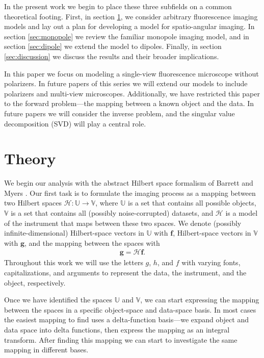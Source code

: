 \documentclass[]{osa-article}
\providecommand{\mb}[1]{\mathbf{#1}}
\providecommand{\mc}[1]{\mathcal{#1}}
\providecommand{\mbb}[1]{\mathbb{#1}}
\begin{document}
In the present work we begin to place these three subfields on a common
theoretical footing. First, in section \ref{sec:theory}, we consider arbitrary
fluorescence imaging models and lay out a plan for developing a model for
spatio-angular
imaging. %
In section \ref{sec:monopole} we review the familiar monopole imaging model, and
in section \ref{sec:dipole} we extend the model to
dipoles. %
Finally, in section \ref{sec:discussion} we discuss the results and their
broader implications.

In this paper we focus on modeling a single-view fluorescence microscope without
polarizers. In future papers of this series we will extend our models to include
polarizers and multi-view microscopes. Additionally, we have restricted this
paper to the forward problem---the mapping between a known object and the data. In
future papers we will consider the inverse problem, and the singular value
decomposition (SVD) will play a central role.
 
\section{Theory}\label{sec:theory}
We begin our analysis with the abstract Hilbert space formalism of Barrett and
Myers \cite[ch.~1.3]{barrett2004}. Our first task is to formulate
the imaging process as a mapping between two Hilbert spaces
$\mc{H}: \mbb{U} \rightarrow \mbb{V}$, where $\mbb{U}$ is a set that contains
all possible objects, $\mbb{V}$ is a set that contains all (possibly
noise-corrupted) datasets, and $\mc{H}$ is a model of the instrument that maps
between these two spaces. We denote (possibly infinite-dimensional)
Hilbert-space vectors in $\mbb{U}$ with $\mb{f}$, Hilbert-space vectors in
$\mbb{V}$ with $\mb{g}$, and the mapping between the spaces with
\begin{align}
  \mb{g} = \mc{H}\mb{f}.
\end{align}
Throughout this work we will use the letters $g$, $h$, and $f$ with varying
fonts, capitalizations, and arguments to represent the data, the instrument, and
the object, respectively.

Once we have identified the spaces $\mbb{U}$ and $\mbb{V}$, we can start
expressing the mapping between the spaces in a specific object-space and
data-space basis. In most cases the easiest mapping to find uses a
delta-function basis---we expand object and data space into delta functions,
then express the mapping as an integral transform. After finding this mapping we
can start to investigate the same mapping in different bases.
\end{document}
